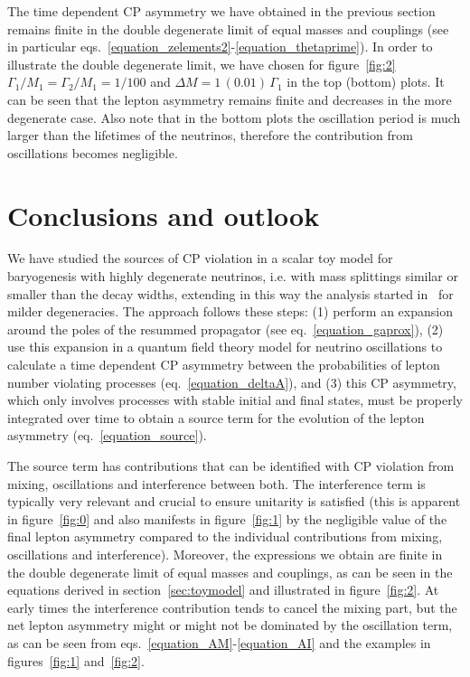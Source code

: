 \documentclass[11pt,a4paper]{article}
\begin{document}
The time dependent CP asymmetry we have obtained in the previous section remains finite in the double degenerate limit of equal masses and couplings (see in particular eqs.~\eqref{equation_zelements2}-\eqref{equation_thetaprime}). In order to illustrate the double degenerate limit, we have chosen for figure~\ref{fig:2} $\Gamma_1/M_1=\Gamma_2/M_1=1/100$ and $\Delta M= 1 \, (0.01) \, \Gamma_1$ in the top (bottom) plots. It can be seen that the lepton asymmetry remains finite and decreases in the more degenerate case. Also note that in the bottom plots the oscillation period is much larger than the lifetimes of the neutrinos, therefore the contribution from oscillations becomes negligible. 



\section{Conclusions and outlook}
\label{sec:con}
We have studied the sources of CP violation in a scalar toy model for baryogenesis with highly degenerate neutrinos, i.e. with mass splittings similar or smaller than the decay widths, extending in this way the analysis started in~\cite{Racker20} for milder degeneracies. The approach follows these steps: (1) perform an expansion around the poles of the resummed propagator (see eq.~\eqref{equation_gaprox}), (2) use this expansion in a quantum field theory model for neutrino oscillations to calculate a time dependent CP asymmetry between the probabilities of lepton number violating processes (eq.~\eqref{equation_deltaA}), and (3) this CP asymmetry, which only involves processes with stable initial and final states, must be properly integrated over time to obtain a source term for the evolution of the lepton asymmetry (eq.~\eqref{equation_source}). 

The source term has contributions that can be identified with CP violation from mixing, oscillations and interference between both. The interference term is typically very relevant and crucial to ensure unitarity is satisfied (this is apparent in figure~\ref{fig:0} and also manifests in figure~\ref{fig:1} by the negligible value of the final lepton asymmetry compared to the individual contributions from mixing, oscillations and interference). Moreover, the expressions we obtain are finite in the double degenerate limit of equal masses and couplings, as can be seen in the equations derived in section~\ref{sec:toymodel} and illustrated in figure~\ref{fig:2}. At early times the interference contribution tends to cancel the mixing part, but the net lepton asymmetry might or might not be dominated by the oscillation term, as can be seen from eqs.~\eqref{equation_AM}-\eqref{equation_AI} and the examples in figures~\ref{fig:1} and~\ref{fig:2}. 
\end{document}
